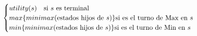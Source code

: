 \documentclass[preview]{standalone}
\begin{document}
\begin{align*}
\begin{cases}
                                 utility(s) \quad \text{si $s$ es terminal} \cr
                                 max\{minimax(\text{estados hijos de $s$})\} \text{si es el turno de Max en $s$} \cr
                                 min\{minimax(\text{estados hijos de $s$})\} \text{si es el turno de Min en $s$} \cr
                                 \end{cases}
\end{align*}
\end{document}
